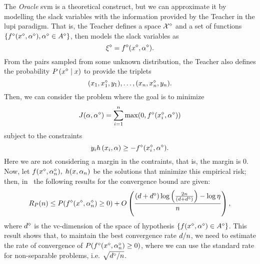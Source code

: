 The \emph{Oracle} \acrshort{svm} is a theoretical construct, but we can approximate it by modelling the slack variables with the information provided by the Teacher in the \acrshort{lupi} paradigm.
That is, the Teacher defines a space ${\mathcal{X}}^{\diamond}$ and a set of functions $\left\{{f}^{\diamond}({x}^{\diamond}, {\alpha}^{\diamond}) , {\alpha}^{\diamond} \in {A}^{\diamond}\right\}$, then models the slack variables as
\begin{equation}
    \nonumber
    {\xi}^{\diamond} = {f}^{\diamond}({x}^{\diamond}, {\alpha}^{\diamond}) .
\end{equation}
From the pairs sampled from some unknown distribution, the Teacher also defines the probability $P\left( {x}^{\diamond} \;\middle\vert\; x \right)$ to provide the triplets
\begin{equation}
    \nonumber
    (x_1, {x}^{\diamond}_1, y_1), \ldots, (x_n, {x}^{\diamond}_n, y_n) .
\end{equation}
Then, we can consider the problem where the goal is to minimize
$$ J(\alpha, {\alpha}^{\diamond}) = \sum_{i=1}^n \max(0, {f}^{\diamond}({x}^{\diamond}_i, {\alpha}^{\diamond})) $$
subject to the constraints
$$ y_i h\left(x_i, \alpha\right) \geq - {f}^{\diamond}({x}^{\diamond}_i, {\alpha}^{\diamond}).$$
Here we are not considering a margin in the contraints, that is, the margin is $0$.
Now, let $f({x}^{\diamond}, {\alpha}^{\diamond}_n),\; h(x, \alpha_n)$ be the solutions that minimize this empirical risk; then, in~\citet[Proposition~2]{VapnikV09} the following results for the convergence bound are given:
\begin{equation}
    \label{eq:lupi_bound}
    \exprisk(\nsamples) \leq P(\priv{f}(\priv{x}, \priv{\param}_\nsamples) \geq 0) + \bigO{\frac{(\vc + \priv{\vc}) \log\left(\frac{2\nsamples}{(\vc + \priv{\vc})} \right) - \log\eta}{\nsamples} } ,
\end{equation}
where ${d}^{\diamond}$ is the \acrshort{vc}-dimension of the space of hypothesis $\left\{f({x}^{\diamond}, {\alpha}^{\diamond}) \in {A}^{\diamond}\right\}$. This result shows that, to maintain the best convergence rate $d/n$, we need to estimate the rate of convergence of $P({f}^{\diamond}({x}^{\diamond}, {\alpha}^{\diamond}_n) \geq 0)$, where we can use the standard rate for non-separable problems, i.e. $\sqrt{{d}^{\diamond}/n}$.

